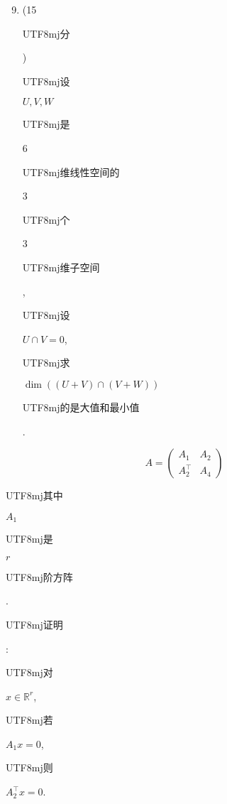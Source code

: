 \documentclass[10pt]{article}
\begin{document}
\begin{enumerate}
  \setcounter{enumi}{8}
  \item (15 \begin{CJK}{UTF8}{mj}分\end{CJK}) \begin{CJK}{UTF8}{mj}设\end{CJK} $U, V, W$ \begin{CJK}{UTF8}{mj}是\end{CJK} 6 \begin{CJK}{UTF8}{mj}维线性空间的\end{CJK} 3 \begin{CJK}{UTF8}{mj}个\end{CJK} 3 \begin{CJK}{UTF8}{mj}维子空间\end{CJK}, \begin{CJK}{UTF8}{mj}设\end{CJK} $U \cap V=0$, \begin{CJK}{UTF8}{mj}求\end{CJK} $\operatorname{dim}((U+V) \cap(V+W))$ \begin{CJK}{UTF8}{mj}的是大值和最小值\end{CJK}.
\end{enumerate}
$$
A=\left(\begin{array}{ll}
A_{1} & A_{2} \\
A_{2}^{\top} & A_{4}
\end{array}\right)
$$
\begin{CJK}{UTF8}{mj}其中\end{CJK} $A_{1}$ \begin{CJK}{UTF8}{mj}是\end{CJK} $r$ \begin{CJK}{UTF8}{mj}阶方阵\end{CJK}. \begin{CJK}{UTF8}{mj}证明\end{CJK}: \begin{CJK}{UTF8}{mj}对\end{CJK} $x \in \mathbb{R}^{r}$, \begin{CJK}{UTF8}{mj}若\end{CJK} $A_{1} x=0$, \begin{CJK}{UTF8}{mj}则\end{CJK} $A_{2}^{\top} x=0$.
\end{document}
